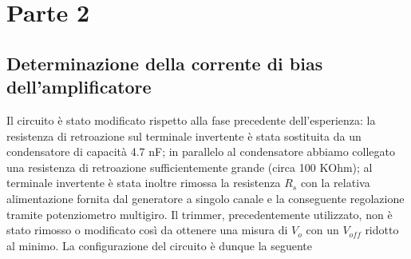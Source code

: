 \documentclass[a4paper, oneside]{article}
\begin{document}
\clearpage
\section{Parte 2}
\subsection{Determinazione della corrente di bias dell'amplificatore}
Il circuito è stato modificato rispetto alla fase precedente dell'esperienza: la resistenza di retroazione sul terminale invertente è stata sostituita da un condensatore di capacità 4.7 nF; in parallelo al condensatore abbiamo collegato una resistenza di retroazione sufficientemente grande (circa 100 KOhm); al terminale invertente è stata inoltre rimossa la resistenza $R_s$ con la relativa alimentazione fornita dal generatore a singolo canale e la conseguente regolazione tramite potenziometro multigiro. Il trimmer, precedentemente utilizzato, non è stato rimosso o modificato così da ottenere una misura di $V_o$ con un $V_{off}$ ridotto al minimo.
La configurazione del circuito è dunque la seguente
\end{document}
